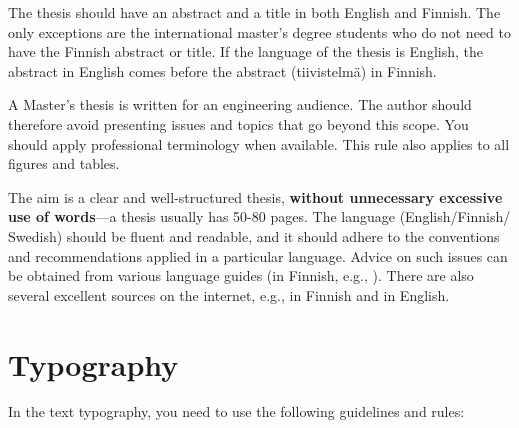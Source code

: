 The thesis should have an abstract and a title in both English and Finnish. The only exceptions are the international master’s degree students who do not need to have the Finnish abstract or title. If the language of the thesis is English, the abstract in English comes before the abstract (tiivistelmä) in Finnish.

A Master’s thesis is written for an engineering audience. The author should therefore avoid presenting issues and topics that go beyond this scope. You should apply professional terminology when available. This rule also applies to all figures and tables.

The aim is a clear and well-structured thesis, \textbf{without unnecessary excessive use of words}---a thesis usually has 50-80 pages. The language (English/Finnish/ Swedish) should be fluent and readable, and it should adhere to the conventions and recommendations applied in a particular language. Advice on such issues can be obtained from various language guides (in Finnish, e.g., \cite{maamies}). There are also several excellent sources on the internet, e.g., \cite{korpela, kielitoimisto} in Finnish and \cite{reportwriting, englishlanguage} in English.

\section{Typography}

In the text typography, you need to use the following guidelines and rules:

